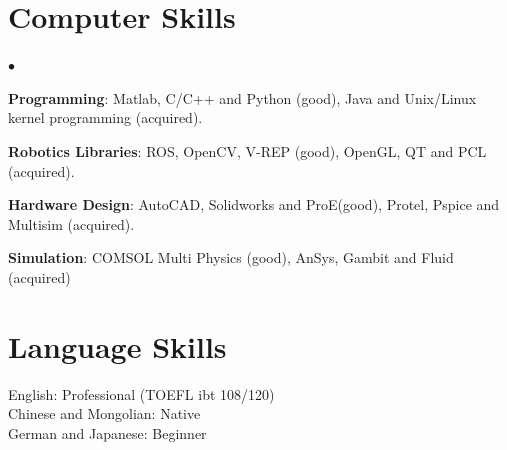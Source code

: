\documentclass[margin,line]{res}
\newenvironment{list2}{
  \begin{list}{$\bullet$}{%
      \setlength{\itemsep}{0in}
      \setlength{\parsep}{0in} \setlength{\parskip}{0in}
      \setlength{\topsep}{0in} \setlength{\partopsep}{0in} 
      \setlength{\leftmargin}{0.2in}}}{\end{list}}
\begin{document}
\begin{resume}
\section{\sc Computer Skills} 
\begin{list2}
\item {\bf Programming}: Matlab, C/C++ and Python (good), Java and Unix/Linux kernel programming (acquired). \\

\item {\bf Robotics Libraries}: ROS, OpenCV, V-REP (good), OpenGL, QT and PCL (acquired).\\

\item {\bf Hardware Design}: AutoCAD, Solidworks and ProE(good), Protel, Pspice and Multisim (acquired).\\

\item {\bf Simulation}: COMSOL Multi Physics (good), AnSys, Gambit and Fluid (acquired) \\
\end{list2}




\section{\sc Language Skills} 
English: Professional (TOEFL ibt 108/120)\\
Chinese and Mongolian: Native\\
German and Japanese: Beginner




\end{resume}
\end{document}
